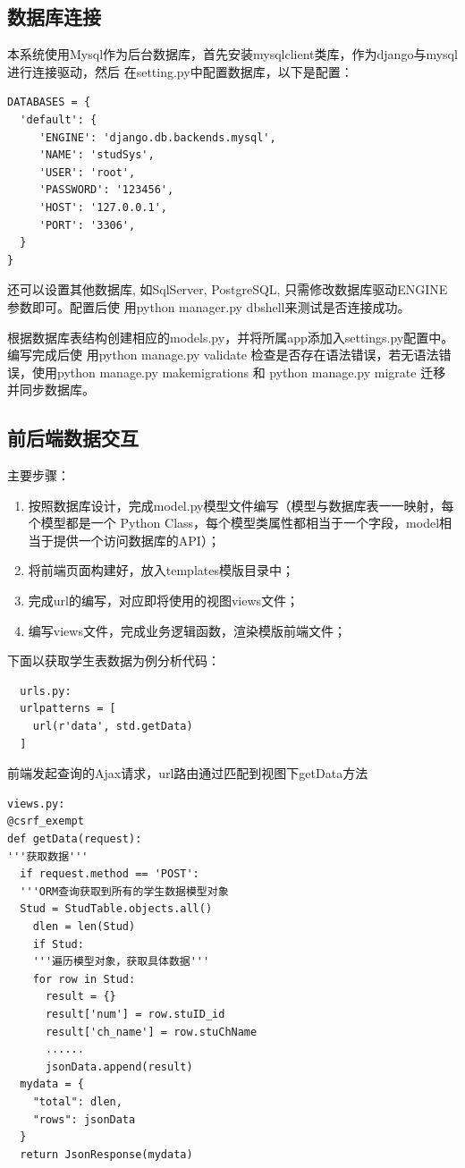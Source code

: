 \documentclass{ede}
\begin{document}
\subsection{数据库连接}

本系统使用Mysql作为后台数据库，首先安装mysqlclient类库，作为django与mysql进行连接驱动，然后
在setting.py中配置数据库，以下是配置：

\begin{verbatim}
DATABASES = {
  'default': {
     'ENGINE': 'django.db.backends.mysql',
     'NAME': 'studSys',
     'USER': 'root',
     'PASSWORD': '123456',
     'HOST': '127.0.0.1',
     'PORT': '3306',
  }
}
\end{verbatim}

还可以设置其他数据库, 如SqlServer, PostgreSQL, 只需修改数据库驱动ENGINE参数即可。配置后使
用python manager.py dbshell来测试是否连接成功。

根据数据库表结构创建相应的models.py，并将所属app添加入settings.py配置中。编写完成后使
用python manage.py validate 检查是否存在语法错误，若无语法错误，使用python manage.py
makemigrations 和 python manage.py migrate 迁移并同步数据库。

\subsection{前后端数据交互}

主要步骤：
\begin{enumerate}
\item 按照数据库设计，完成model.py模型文件编写（模型与数据库表一一映射，每个模型都是一个
  Python Class，每个模型类属性都相当于一个字段，model相当于提供一个访问数据库的API）；
\item 将前端页面构建好，放入templates模版目录中；
\item 完成url的编写，对应即将使用的视图views文件；
\item 编写views文件，完成业务逻辑函数，渲染模版前端文件；
\end{enumerate}
下面以获取学生表数据为例分析代码：

\begin{verbatim}
  urls.py:
  urlpatterns = [
    url(r'data', std.getData)
  ]
\end{verbatim}

前端发起查询的Ajax\cite{Liu2017Testing}请求，url路由通过匹配到视图下getData方法

\begin{verbatim}
views.py:
@csrf_exempt
def getData(request):
'''获取数据'''
  if request.method == 'POST':
  '''ORM查询获取到所有的学生数据模型对象  
  Stud = StudTable.objects.all()
    dlen = len(Stud) 
    if Stud:
    '''遍历模型对象，获取具体数据'''
    for row in Stud:
      result = {}
      result['num'] = row.stuID_id 
      result['ch_name'] = row.stuChName
      ......
      jsonData.append(result)
  mydata = {
    "total": dlen,
    "rows": jsonData
  }
  return JsonResponse(mydata)
\end{verbatim}
\end{document}
